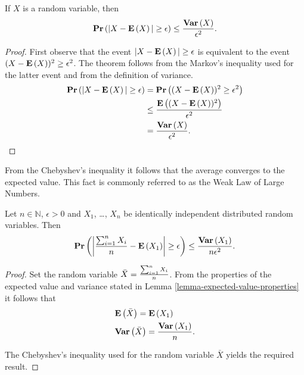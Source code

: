 \begin{theorem}
\label{theorem-chebyshev-inequality}
If $X$ is a random variable, then \[ \mathbf{Pr}\left(|X - \mathbf{E}\left(X\right)| \geq \epsilon\right) \leq \frac{\mathbf{Var}\left(X\right)}{\epsilon ^ 2} \text{.} \]
\end{theorem}
\begin{proof}
First observe that the event $|X - \mathbf{E}\left(X\right)| \geq \epsilon$ is equivalent to the event $(X - \mathbf{E}\left(X\right)) ^ 2 \geq \epsilon ^ 2$. The theorem follows from the Markov's inequality used for the latter event and from the definition of variance. 
\[
\begin{split}
\mathbf{Pr}\left(|X - \mathbf{E}\left(X\right)| \geq \epsilon\right) 
	& = \mathbf{Pr}\left((X - \mathbf{E}\left(X\right)) ^ 2 \geq \epsilon ^ 2\right) \\
	& \leq \frac{\mathbf{E}\left((X - \mathbf{E}\left(X\right)) ^ 2\right)}{\epsilon ^ 2} \\
	& = \frac{\mathbf{Var}\left(X\right)}{\epsilon ^ 2} \text{.}
\end{split}
\]
\end{proof}

From the Chebyshev's inequality it follows that the average converges to the expected value. This fact is commonly referred to as the Weak Law of Large Numbers.
\begin{theorem}
\label{theorem-weak-law-of-large-numbers}
Let $n \in \mathbb{N}$, $\epsilon > 0$ and $X_1$, \dots, $X_n$ be identically independent distributed random variables. Then 
\[
\mathbf{Pr}\left(\left| \frac{\sum\displaylimits_{i = 1}^{n} X_i}{n} - \mathbf{E}\left(X_1\right) \right| \geq \epsilon\right) \leq \frac{\mathbf{Var}\left(X_1\right)}{n\epsilon ^ 2} \text{.}
\]
\end{theorem}
\begin{proof}
Set the random variable $\bar{X} = \frac{\sum\displaylimits_{i = 1}^{n} X_i}{n}$. From the properties of the expected value and variance stated in Lemma \ref{lemma-expected-value-properties} it follows that 
\[
\begin{split}
& \mathbf{E}\left(\bar{X}\right) = \mathbf{E}\left(X_1\right) \\
& \mathbf{Var}\left(\bar{X}\right) = \frac{\mathbf{Var}\left(X_1\right)}{n} \text{.}
\end{split}
\]

The Chebyshev's inequality used for the random variable $\bar{X}$ yields the required result.
\end{proof}

